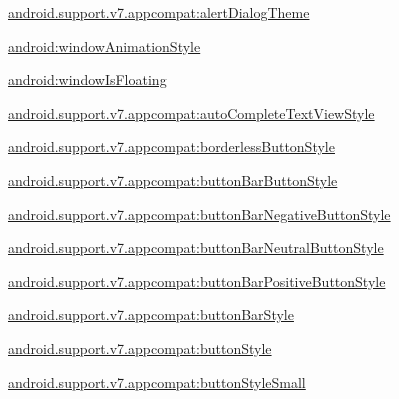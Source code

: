 {\ttfamily \hyperlink{classandroid_1_1support_1_1v7_1_1appcompat_1_1R_1_1styleable_a5bc1ecd8175fad8bacd655f7fa16ed65}{android.\+support.\+v7.\+appcompat\+:alert\+Dialog\+Theme}}

{\ttfamily \hyperlink{classandroid_1_1support_1_1v7_1_1appcompat_1_1R_1_1styleable_a1c2effe7929579ca9cda625eea813fa8}{android\+:window\+Animation\+Style}}

{\ttfamily \hyperlink{classandroid_1_1support_1_1v7_1_1appcompat_1_1R_1_1styleable_ad637edc116aeaf8ff24acde3e972dee9}{android\+:window\+Is\+Floating}}

{\ttfamily \hyperlink{classandroid_1_1support_1_1v7_1_1appcompat_1_1R_1_1styleable_ad197292c918a85fb914e559e9992c78a}{android.\+support.\+v7.\+appcompat\+:auto\+Complete\+Text\+View\+Style}}

{\ttfamily \hyperlink{classandroid_1_1support_1_1v7_1_1appcompat_1_1R_1_1styleable_a0011ad8765746112dd3b16d0be2ae0dc}{android.\+support.\+v7.\+appcompat\+:borderless\+Button\+Style}}

{\ttfamily \hyperlink{classandroid_1_1support_1_1v7_1_1appcompat_1_1R_1_1styleable_a5a418303f6c9ee7dca64fc5e087c5d5d}{android.\+support.\+v7.\+appcompat\+:button\+Bar\+Button\+Style}}

{\ttfamily \hyperlink{classandroid_1_1support_1_1v7_1_1appcompat_1_1R_1_1styleable_a99db68caf8feef60226a106581b9314e}{android.\+support.\+v7.\+appcompat\+:button\+Bar\+Negative\+Button\+Style}}

{\ttfamily \hyperlink{classandroid_1_1support_1_1v7_1_1appcompat_1_1R_1_1styleable_aec02227eb23e237d76e41c93095e1acc}{android.\+support.\+v7.\+appcompat\+:button\+Bar\+Neutral\+Button\+Style}}

{\ttfamily \hyperlink{classandroid_1_1support_1_1v7_1_1appcompat_1_1R_1_1styleable_a5a97b06013106a661c91f3f55df6b4d0}{android.\+support.\+v7.\+appcompat\+:button\+Bar\+Positive\+Button\+Style}}

{\ttfamily \hyperlink{classandroid_1_1support_1_1v7_1_1appcompat_1_1R_1_1styleable_a5f507e4262ada8a443068f2d7537585f}{android.\+support.\+v7.\+appcompat\+:button\+Bar\+Style}}

{\ttfamily \hyperlink{classandroid_1_1support_1_1v7_1_1appcompat_1_1R_1_1styleable_a04456db225a82b7745bd0f1915afe311}{android.\+support.\+v7.\+appcompat\+:button\+Style}}

{\ttfamily \hyperlink{classandroid_1_1support_1_1v7_1_1appcompat_1_1R_1_1styleable_a1cb9b470321310da072244cad16cbda3}{android.\+support.\+v7.\+appcompat\+:button\+Style\+Small}}

